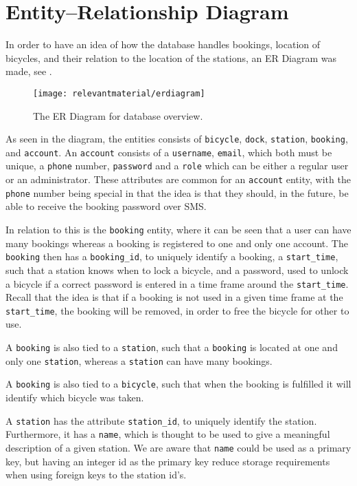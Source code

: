 \section{Entity--Relationship Diagram}\label{sec:ERdiagram}
In order to have an idea of how the database handles bookings, location of bicycles, and their relation to the location of the stations, an ER Diagram was made, see .

\begin{figure}
	\centering
	\texttt{[image: relevantmaterial/erdiagram]}
	\caption{The ER Diagram for database overview.}\label{fig:er-dia}
\end{figure}

As seen in the diagram, the entities consists of \texttt{bicycle}, \texttt{dock}, \texttt{station}, \texttt{booking}, and \texttt{account}.
An \texttt{account} consists of a \texttt{username}, \texttt{email}, which both must be unique, a \texttt{phone} number, \texttt{password} and a \texttt{role} which can be either a regular user or an administrator.
These attributes are common for an \texttt{account} entity, with the \texttt{phone} number being special in that the idea is that they should, in the future, be able to receive the booking password over SMS.

In relation to this is the \texttt{booking} entity, where it can be seen that a user can have many bookings whereas a booking is registered to one and only one account.
The \texttt{booking} then has a \texttt{booking_id}, to uniquely identify a booking, a \texttt{start_time}, such that a station knows when to lock a bicycle, and a password, used to unlock a bicycle if a correct password is entered in a time frame around the \texttt{start_time}.
Recall that the idea is that if a booking is not used in a given time frame at the \texttt{start_time}, the booking will be removed, in order to free the bicycle for other to use.

A \texttt{booking} is also tied to a \texttt{station}, such that a \texttt{booking} is located at one and only one \texttt{station}, whereas a \texttt{station} can have many bookings.

A \texttt{booking} is also tied to a \texttt{bicycle}, such that when the booking is fulfilled it will identify which bicycle was taken.

A \texttt{station} has the attribute \texttt{station_id}, to uniquely identify the station.
Furthermore, it has a \texttt{name}, which is thought to be used to give a meaningful description of a given station.
We are aware that \texttt{name} could be used as a primary key, but having an integer id as the primary key reduce storage requirements when using foreign keys to the station id's.

